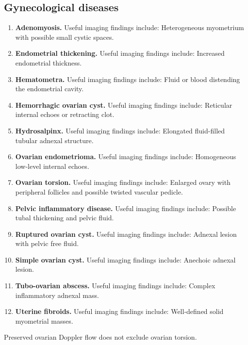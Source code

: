 \subsection{Gynecological diseases}
\begin{enumerate}[leftmargin=*,itemsep=0.45em,topsep=0.4em]
\item \textbf{Adenomyosis.} Useful imaging findings include: Heterogeneous myometrium with possible small cystic spaces.
\item \textbf{Endometrial thickening.} Useful imaging findings include: Increased endometrial thickness.
\item \textbf{Hematometra.} Useful imaging findings include: Fluid or blood distending the endometrial cavity.
\item \textbf{Hemorrhagic ovarian cyst.} Useful imaging findings include: Reticular internal echoes or retracting clot.
\item \textbf{Hydrosalpinx.} Useful imaging findings include: Elongated fluid-filled tubular adnexal structure.
\item \textbf{Ovarian endometrioma.} Useful imaging findings include: Homogeneous low-level internal echoes.
\item \textbf{Ovarian torsion.} Useful imaging findings include: Enlarged ovary with peripheral follicles and possible twisted vascular pedicle.
\item \textbf{Pelvic inflammatory disease.} Useful imaging findings include: Possible tubal thickening and pelvic fluid.
\item \textbf{Ruptured ovarian cyst.} Useful imaging findings include: Adnexal lesion with pelvic free fluid.
\item \textbf{Simple ovarian cyst.} Useful imaging findings include: Anechoic adnexal lesion.
\item \textbf{Tubo-ovarian abscess.} Useful imaging findings include: Complex inflammatory adnexal mass.
\item \textbf{Uterine fibroids.} Useful imaging findings include: Well-defined solid myometrial masses.
\end{enumerate}
Preserved ovarian Doppler flow does not exclude ovarian torsion.

